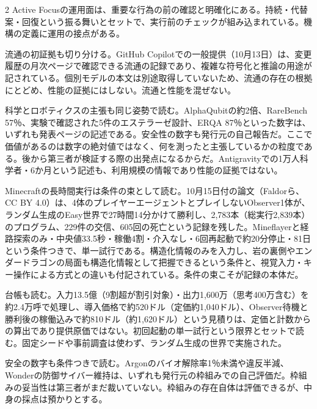 \documentclass[lualatex,a4paper,10pt]{jlreq}
\begin{document}
\begin{multicols}{2}
Active Focusの運用面は、重要な行為の前の確認と明確化にある。持続・代替案・回復という振る舞いとセットで、実行前のチェックが組み込まれている。機構の定義に運用の接点がある。
\cite{B01,B62,B63,B02,B64,B03}


流通の初証拠も切り分ける。GitHub Copilotでの一般提供（10月13日）は、変更履歴の月次ページで確認できる流通の記録であり、複雑な符号化と推論の用途が記されている。個別モデルの本文は別途取得していないため、流通の存在の根拠にとどめ、性能の証拠にはしない。流通と性能を混ぜない。
\cite{B05,B65,B08,B04,B07,B06}


科学とロボティクスの主張も同じ姿勢で読む。AlphaQubitの約2倍、RareBench 57％、実験で確認された5件のエステラーゼ設計、ERQA 87％といった数字は、いずれも発表ページの記述である。安全性の数字も発行元の自己報告だ。ここで価値があるのは数字の絶対値ではなく、何を測ったと主張しているかの粒度である。後から第三者が検証する際の出発点になるからだ。Antigravityでの1万人科学者・6か月という記述も、利用規模の情報であり性能の証拠ではない。
\cite{B05,B65,B08,B04,B07,B06}


Minecraftの長時間実行は条件の束として読む。10月15日付の論文（Faldorら、CC BY 4.0）は、4体のプレイヤーエージェントとプレイしないObserver1体が、ランダム生成のEasy世界で27時間14分かけて勝利し、2,783本（総実行2,839本）のプログラム、229件の交信、605回の死亡という記録を残した。Mineflayerと経路探索のみ・中央値33.5秒・稼働4割・介入なし・6回再起動で約20分停止・81日という条件つきで、単一試行である。構造化情報のみを入力し、岩の裏側やエンダードラゴンの局面も構造化情報として把握できるという条件と、視覚入力・キー操作による方式との違いも付記されている。条件の束こそが記録の本体だ。
\cite{B05,B65,B08,B04,B07,B06}


台帳も読む。入力13.5億（9割超が割引対象）・出力1,600万（思考400万含む）を約2.4万呼で処理し、導入価格で約520ドル（定価約1,040ドル）、Observer待機と勝利後の稼働込みで約810ドル（約1,620ドル）という見積りは、定価と計数からの算出であり提供原価ではない。初回起動の単一試行という限界とセットで読む。固定シードや事前調査は使わず、ランダム生成の世界で実施された。
\cite{B05,B65,B08,B04,B07,B06}


安全の数字も条件つきで読む。Argonのバイオ解除率1％未満や違反半減、Wonderの防御サイバー維持は、いずれも発行元の枠組みでの自己評価だ。枠組みの妥当性は第三者がまだ裁いていない。枠組みの存在自体は評価できるが、中身の採点は預かりとする。
\cite{B01,B62,B63,B02,B64,B03,B05,B65,B08,B04,B07,B06}


\end{multicols} %
\end{document}
